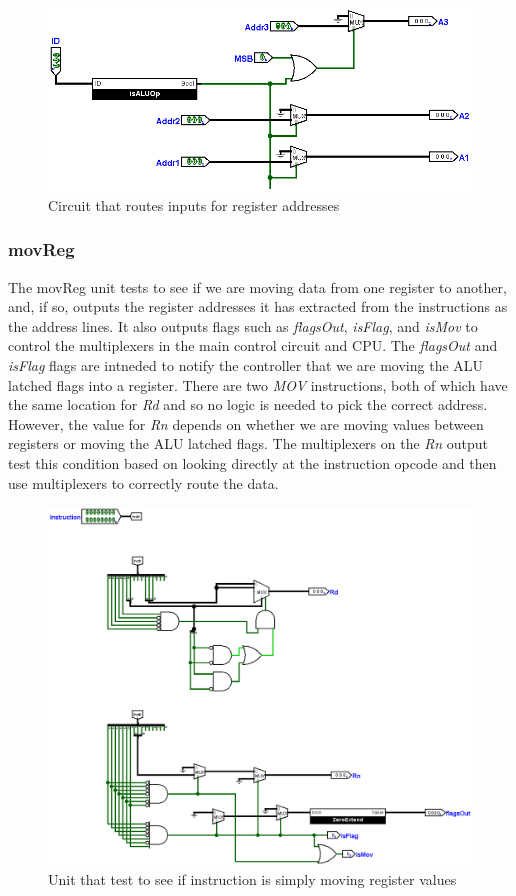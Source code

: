 \documentclass[12pt, letter]{article}
\begin{document}
	\begin{figure}[h]
		\centering
		\includegraphics[scale = 0.3]{AInput}
		\caption{Circuit that routes inputs for register addresses}
		\label{fig:AInput}
	\end{figure}

	\subsubsection{movReg}
	The movReg unit tests to see if we are moving data from one register to another, and, if so, outputs the register addresses it has extracted from the instructions as the address lines. It also outputs flags such as \textit{flagsOut}, \textit{isFlag}, and \textit{isMov} to control the multiplexers in the main control circuit and CPU. The \textit{flagsOut} and \textit{isFlag} flags are intneded to notify the controller that we are moving the ALU latched flags into a register. There are two \textit{MOV} instructions, both of which have the same location for \textit{Rd} and so no logic is needed to pick the correct address. However, the value for \textit{Rn} depends on whether we are moving values between registers or moving the ALU latched flags. The multiplexers on the \textit{Rn} output test this condition based on looking directly at the instruction opcode and then use multiplexers to correctly route the data.
	
	\begin{figure}[h]
		\centering
		\includegraphics[scale = 0.2]{MovReg}
		\caption{Unit that test to see if instruction is simply moving register values}
		\label{fig:MovReg}
	\end{figure}
\end{document}
